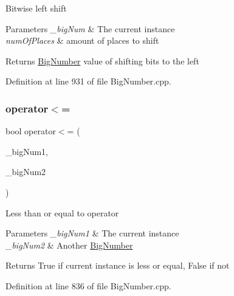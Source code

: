 Bitwise left shift 
\begin{DoxyParams}{Parameters}
{\em \+\_\+big\+Num} & The current instance \\
\hline
{\em num\+Of\+Places} & amount of places to shift \\
\hline
\end{DoxyParams}
\begin{DoxyReturn}{Returns}
\mbox{\hyperlink{class_big_nums_1_1_big_number}{Big\+Number}} value of shifting bits to the left 
\end{DoxyReturn}


Definition at line 931 of file Big\+Number.\+cpp.

\mbox{\label{class_big_nums_1_1_big_number_a787ad7c1ee1b244a545034fbe1e09431}} 
\subsubsection{\texorpdfstring{operator$<$=}{operator<=}\hspace{0.1cm}{\footnotesize\ttfamily [1/2]}}
{\footnotesize\ttfamily bool operator$<$= (\begin{DoxyParamCaption}\item[{const \mbox{\hyperlink{class_big_nums_1_1_big_number}{Big\+Number}} \&}]{\+\_\+big\+Num1,  }\item[{const \mbox{\hyperlink{class_big_nums_1_1_big_number}{Big\+Number}} \&}]{\+\_\+big\+Num2 }\end{DoxyParamCaption})\hspace{0.3cm}{\ttfamily [friend]}}

Less than or equal to operator 
\begin{DoxyParams}{Parameters}
{\em \+\_\+big\+Num1} & The current instance \\
\hline
{\em \+\_\+big\+Num2} & Another \mbox{\hyperlink{class_big_nums_1_1_big_number}{Big\+Number}} \\
\hline
\end{DoxyParams}
\begin{DoxyReturn}{Returns}
True if current instance is less or equal, False if not 
\end{DoxyReturn}


Definition at line 836 of file Big\+Number.\+cpp.

\mbox{\label{class_big_nums_1_1_big_number_a05bfb6df81cae921364aec33df340215}} 
